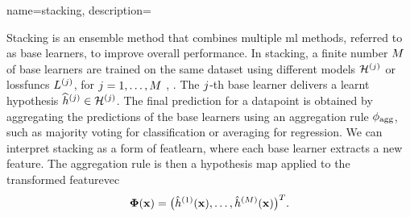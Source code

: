 {name={stacking}, 
	description={Stacking is an ensemble method that combines multiple 
		\gls{ml} methods, referred to as base learners, to improve overall performance. 
		In stacking, a finite number $M$ of base learners are trained on the 
		same \gls{dataset} using different \glspl{model} $\mathcal{H}^{(j)}$ 
		or \glspl{lossfunc} $L^{(j)}$, 
        for $j=1,\ldots,M$ \cite[Ch. 8.8]{hastie01statisticallearning},
		\cite{WOLPERT1992241,ZhouEnsemble2012}. 
		The $j$-th base learner delivers a learnt \gls{hypothesis} 
		$\widehat{h}^{(j)} \in \mathcal{H}^{(j)}$. 
		The final \gls{prediction} for a \gls{datapoint} is obtained by aggregating the 
		\glspl{prediction} of the base learners using an aggregation rule $\phi_{\rm agg}$, 
		such as majority voting for \gls{classification} or averaging for \gls{regression}. 
		We can interpret stacking as a form of \gls{featlearn}, where each base learner 
		extracts a new \gls{feature}. The aggregation rule is then 
		a \gls{hypothesis} map applied to the transformed \gls{featurevec} 
		$${\bf \Phi}({\bf x})= \big( \hat{h}^{(1)}({\bf x}), 
		\ldots, \hat{h}^{(M)}({\bf x}) \big)^{T}.$$
       \begin{figure}[htbp]
		\begin{center}
\end{center}
\end{figure}}}
